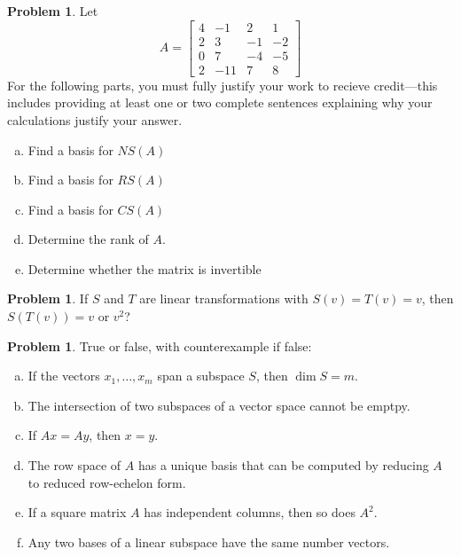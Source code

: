 \documentclass[10pt]{article}
\theoremstyle{definition}
\newtheorem{problem}[theorem]{Problem}
\newcommand{\1}[1]{\textbf{1}_{\left[#1\right]}} %
\begin{document}
\begin{problem}
  Let
  \begin{equation*}
    A=
    \begin{bmatrix}
      4&-1&2&1\\
      2&3&-1&-2\\
      0&7&-4&-5\\
      2&-11&7&8
    \end{bmatrix}
  \end{equation*}
  For the following parts, you must fully justify your work to recieve
  credit---this includes providing at least one or two complete sentences
  explaining why your calculations justify your answer.
  \begin{enumerate}[(a)]
    \setlength{\itemsep}{0pt}
    \item Find a basis for $NS(A)$
    \item Find a basis for $RS(A)$
    \item Find a basis for $CS(A)$
    \item Determine the rank of $A$.
    \item Determine whether the matrix is invertible
  \end{enumerate}
\end{problem}

\begin{problem}
  If $S$ and $T$ are linear transformations with $S(v)=T(v)=v$, then
  $S(T(v))=v$ or $v^{2}$?
\end{problem}


\begin{problem}
  True or false, with counterexample if false:
  \begin{enumerate}[(a)]
    \setlength{\itemsep}{0pt}
    \item If the vectors $x_{1},\ldots,x_{m}$ span a subspace $S$, then $\dim
    S =m.$
    \item The intersection of two subspaces of a vector space cannot be
    emptpy.
    \item If $Ax=Ay$, then $x=y$.
    \item The row space of $A$ has a unique basis that can be computed by
    reducing $A$ to reduced row-echelon form.
    \item If a square matrix $A$ has independent columns, then so does
    $A^{2}$.
    \item Any two bases of a linear subspace have the same number vectors.
  \end{enumerate}
\end{problem}
\end{document}
